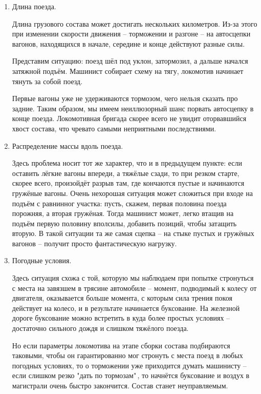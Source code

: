 \begin{enumerate}
\item Длина поезда.

Длина грузового состава может достигать нескольких километров. Из-за этого при изменении скорости движения -- торможении и разгоне -- на автосцепки вагонов, находящихся в начале, середине и конце действуют разные силы.

Представим ситуацию: поезд шёл под уклон, затормозил, а дальше начался затяжной подъём. Машинист собирает схему на тягу, локомотив начинает тянуть за собой поезд.

Первые вагоны уже не удерживаются тормозом, чего нельзя сказать про задние. Таким образом, мы имеем неиллюзорный шанс порвать автосцепку в конце поезда. Локомотивная бригада скорее всего не увидит оторвавшийся хвост состава, что чревато самыми неприятными последствиями.

\item Распределение массы вдоль поезда.

Здесь проблема носит тот же характер, что и в предыдущем пункте: если оставить лёгкие вагоны впереди, а тяжёлые сзади, то при резком старте, скорее всего, произойдёт разрыв там, где кончаются пустые и начинаются гружёные вагоны. Очень нехорошая ситуация может сложиться при входе на подъём с равнинног участка: пусть, скажем, первая половина поезда порожняя, а вторая гружёная. Тогда машинист может, легко втащив на подъём первую половину вполсилы, добавить позиций, чтобы затащить вторую. В такой ситуации та же самая сцепка -- на стыке пустых и гружёных вагонов -- получит просто фантастическую нагрузку.

\item Погодные условия.

Здесь ситуация схожа с той, которую мы наблюдаем при попытке стронуться с места на завязшем в трясине автомобиле -- момент, подводимый к колесу от двигателя, оказывается больше момента, с которым сила трения покоя действует на колесо, и в результате начинается буксование. На железной дороге буксование можно встретить в куда более простых условиях -- достаточно сильного дождя и слишком тяжёлого поезда.

Но если параметры локомотива на этапе сборки состава подбираются таковыми, чтобы он гарантированно мог стронуть с места поезд в любых погодных условиях, то о торможении уже приходится думать машинисту -- если слишком резко "дать по тормозам"\,, то начнётся буксование и воздух в магистрали очень быстро закончится. Состав станет неуправляемым.
\end{enumerate}

